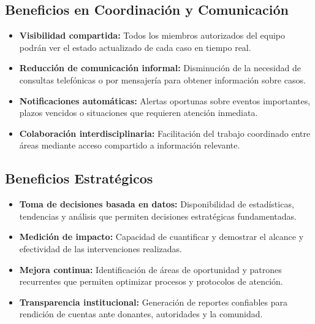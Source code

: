 \documentclass[12pt,letterpaper]{article}
\begin{document}
\subsection{Beneficios en Coordinación y Comunicación}

\begin{itemize}
    \item \textbf{Visibilidad compartida:} Todos los miembros autorizados del equipo podrán ver el estado actualizado de cada caso en tiempo real.
    
    \item \textbf{Reducción de comunicación informal:} Disminución de la necesidad de consultas telefónicas o por mensajería para obtener información sobre casos.
    
    \item \textbf{Notificaciones automáticas:} Alertas oportunas sobre eventos importantes, plazos vencidos o situaciones que requieren atención inmediata.
    
    \item \textbf{Colaboración interdisciplinaria:} Facilitación del trabajo coordinado entre áreas mediante acceso compartido a información relevante.
\end{itemize}

\subsection{Beneficios Estratégicos}

\begin{itemize}
    \item \textbf{Toma de decisiones basada en datos:} Disponibilidad de estadísticas, tendencias y análisis que permiten decisiones estratégicas fundamentadas.
    
    \item \textbf{Medición de impacto:} Capacidad de cuantificar y demostrar el alcance y efectividad de las intervenciones realizadas.
    
    \item \textbf{Mejora continua:} Identificación de áreas de oportunidad y patrones recurrentes que permiten optimizar procesos y protocolos de atención.
    
    \item \textbf{Transparencia institucional:} Generación de reportes confiables para rendición de cuentas ante donantes, autoridades y la comunidad.
\end{itemize}
\end{document}
